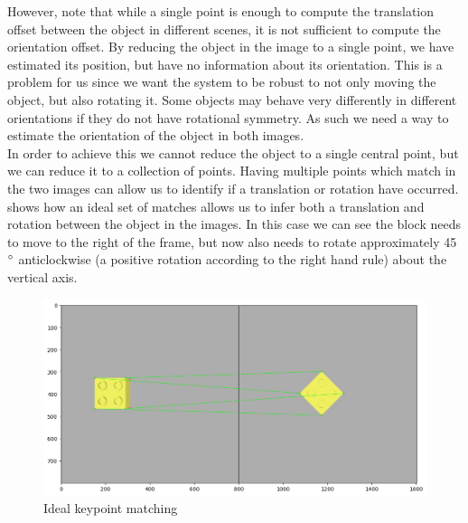 However, note that while a single point is enough to compute the translation offset between the object in different scenes, it is not sufficient to compute the orientation offset. By reducing the object in the image to a single point, we have estimated its position, but have no information about its orientation. This is a problem for us since we want the system to be robust to not only moving the object, but also rotating it. Some objects may behave very differently in different orientations if they do not have rotational symmetry. As such we need a way to estimate the orientation of the object in both images.\\

In order to achieve this we cannot reduce the object to a single central point, but we can reduce it to a collection of points. Having multiple points which match in the two images can allow us to identify if a translation or rotation have occurred.  shows how an ideal set of matches allows us to infer both a translation and rotation between the object in the images. In this case we can see the block needs to move to the right of the frame, but now also needs to rotate approximately 45$\operatorname{^{\circ}}$ anticlockwise (a positive rotation according to the right hand rule) about the vertical axis.\\

\begin{figure}[h]
    \centering
    \includegraphics[width=\textwidth]{figures/ideal_matches.png}
    \caption{Ideal keypoint matching}
    \label{fig:ideal-matches}
\end{figure}

